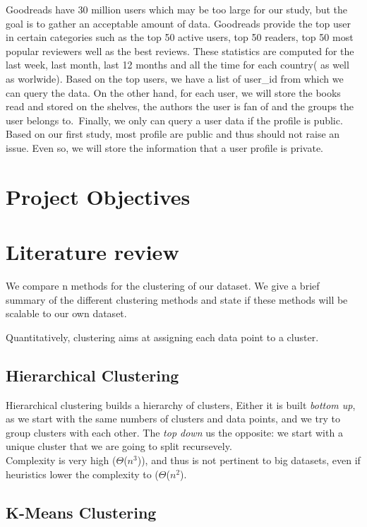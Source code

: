 \documentclass[11pt]{article}
\begin{document}
Goodreads have 30 million users which may be too large for our study, but the goal is to gather an acceptable amount of data. Goodreads provide the top user in certain categories such as the top 50 active users, top 50 readers, top 50 most popular reviewers well as the best reviews. These statistics are computed for the last week, last month, last 12 months and all the time for each country( as well as worlwide).
Based on the top users, we have a list of user\_id from which we can query the data. On the other hand, for each user, we will store the books read and stored on the shelves, the authors the user is fan of and the groups the user belongs to.\
Finally, we only can query a user data if the profile is public. Based on our first study, most profile are public and thus should not raise an issue. Even so, we will store the information that a user profile is private.


\section{Project Objectives}

\section{Literature review}

We compare n methods for the clustering of our dataset. We give a brief summary of the different clustering methods and state if these methods will be scalable to our own dataset.

Quantitatively, clustering aims at assigning each data point to a cluster.



\subsection{Hierarchical Clustering}
Hierarchical clustering builds a hierarchy of clusters, Either it is built \emph{bottom up}, as we start with the same numbers of clusters and data points, and we try to group clusters with each other. The \emph{top down} us the opposite: we start with a unique cluster that we are going to split recursevely.\\

Complexity is very high ($\Theta$($n^3$)), and thus is not pertinent to big datasets, even if heuristics lower the complexity to ($\Theta$($n^2$).




\subsection{K-Means Clustering}
\end{document}
